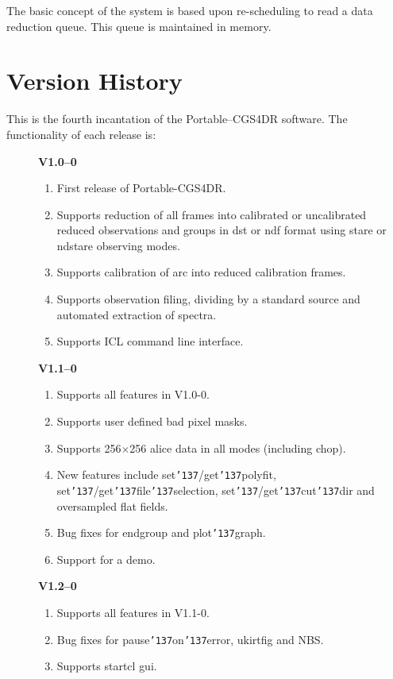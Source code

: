 \documentclass[a4paper]{book}
\renewcommand{\_}{{\tt\char'137}}
\begin{document}
The basic concept of the system is based upon re-scheduling to read a
data reduction queue.  This queue is maintained in memory.

\section{Version History}
This is the fourth incantation of the Portable--CGS4DR software. The
functionality of each release is:

\begin{description}
\item[] {\bf V1.0--0}
 \begin{enumerate}
  \item First release of Portable-CGS4DR.
  \item Supports reduction of all frames into calibrated or uncalibrated reduced
        observations and groups in {\sc dst} or {\sc ndf} format using {\sc stare}
        or {\sc ndstare} observing modes.
  \item Supports calibration of {\sc arc} into reduced calibration frames.
  \item Supports observation filing, dividing by a standard source and automated
        extraction of spectra.
  \item Supports ICL command line interface.
 \end{enumerate}
\item[] {\bf V1.1--0}
 \begin{enumerate}
  \item Supports all features in V1.0-0.
  \item Supports user defined bad pixel masks.
  \item Supports 256$\times$256 {\sc alice} data in all modes (including {\sc chop}).
  \item New features include set\_/get\_polyfit, set\_/get\_file\_selection, set\_/get\_cut\_dir
        and oversampled {\sc flat} fields.
  \item Bug fixes for endgroup and plot\_graph.
  \item Support for a demo.
 \end{enumerate}
\item[] {\bf V1.2--0}
 \begin{enumerate}
  \item Supports all features in V1.1-0.
  \item Bug fixes for pause\_on\_error, ukirtfig and NBS.
  \item Supports {\sc startcl} {\sc gui}.

\end{enumerate}
\end{description}
\end{document}
